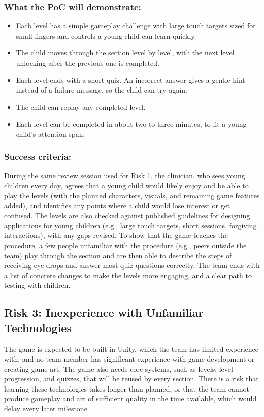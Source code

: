 \documentclass{article}
\begin{document}
\subsubsection*{What the PoC will demonstrate:}
\begin{itemize}
  \item Each level has a simple gameplay challenge with large touch targets
  sized for small fingers and controls a young child can learn quickly.
  \item The child moves through the section level by level, with the next level
  unlocking after the previous one is completed.
  \item Each level ends with a short quiz. An incorrect answer gives a gentle
  hint instead of a failure message, so the child can try again.
  \item The child can replay any completed level.
  \item Each level can be completed in about two to three minutes, to fit a
  young child's attention span.
\end{itemize}

\subsubsection*{Success criteria:}
During the same review session used for Risk 1, the clinician, who sees young
children every day, agrees that a young child would likely enjoy and be able to
play the levels (with the planned characters, visuals, and remaining game
features added), and identifies any points where a child would lose interest or
get confused. The levels are also checked against published guidelines for
designing applications for young children (e.g., large touch targets, short
sessions, forgiving interactions), with any gaps revised. To show that the game
teaches the procedure, a few people unfamiliar with the procedure (e.g., peers
outside the team) play through the section and are then able to describe the
steps of receiving eye drops and answer most quiz questions correctly. The team
ends with a list of concrete changes to make the levels more engaging, and a
clear path to testing with children.

\subsection{Risk 3: Inexperience with Unfamiliar Technologies}

The game is expected to be built in Unity, which the team has limited
experience with, and no team member has significant experience with game
development or creating game art. The game also needs core systems, such as
levels, level progression, and quizzes, that will be reused by every section.
There is a risk that learning these technologies takes longer than planned, or
that the team cannot produce gameplay and art of sufficient quality in the time
available, which would delay every later milestone.
\end{document}
